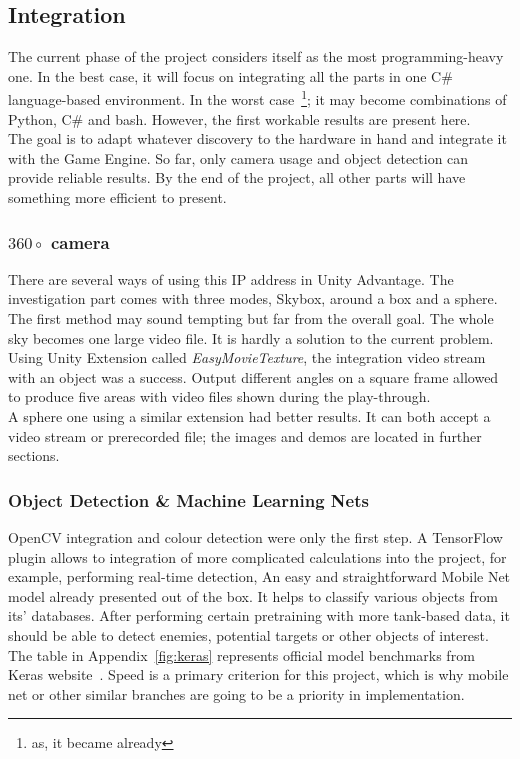 \subsection{Integration}
The current phase of the project considers itself as the most programming-heavy one.
In the best case, it will focus on integrating all the parts in one C\# language-based environment.
In the worst case~\footnote{as, it became already}; it may become combinations of Python, C\# and bash.
However, the first workable results are present here.\\[1pc]
The goal is to adapt whatever discovery to the hardware in hand and integrate it with the Game Engine.
So far, only camera usage and object detection can provide reliable results.
By the end of the project, all other parts will have something more efficient to present.
\subsubsection{$360\circ$ camera}
There are several ways of using this IP address in Unity Advantage.
The investigation part comes with three modes, Skybox, around a box and a sphere.\\
The first method may sound tempting but far from the overall goal.
The whole sky becomes one large video file.
It is hardly a solution to the current problem. \\
Using Unity Extension called \textit{EasyMovieTexture}, the integration video stream with an object was a success.
Output different angles on a square frame allowed to produce five areas with video files shown during the play-through. \\
A sphere one using a similar extension had better results.
It can both accept a video stream or prerecorded file; the images and demos are located in further sections.
\subsubsection{Object Detection \& Machine Learning Nets}
OpenCV integration and colour detection were only the first step.
A TensorFlow plugin allows to integration of more complicated calculations into the project, for example, performing real-time detection, 
An easy and straightforward Mobile Net model already presented out of the box.
It helps to classify various objects from its' databases.
After performing certain pretraining with more tank-based data, it should be able to detect enemies, potential targets or other objects of interest.
The table in Appendix~\ref{fig:keras} represents official model benchmarks from Keras website~\cite{noauthor_applications_2018}.
Speed is a primary criterion for this project, which is why mobile net or other similar branches are going to be a priority in implementation.
